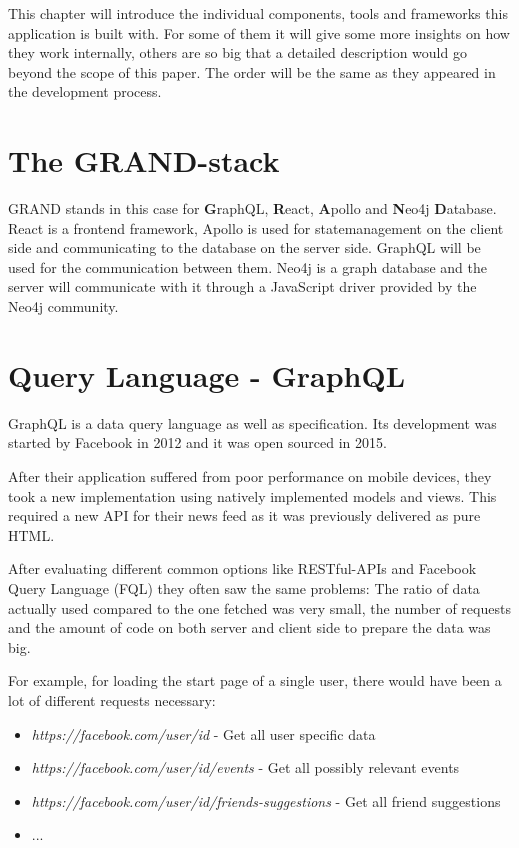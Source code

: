 This chapter will introduce the individual components, tools and frameworks this application is built with. For some of them it will give some more insights on how they work internally, others are so big that a detailed description would go beyond the scope of this paper. The order will be the same as they appeared in the development process.

\section{The GRAND-stack}
GRAND stands in this case for \textbf{G}raphQL, \textbf{R}eact, \textbf{A}pollo and \textbf{N}eo4j \textbf{D}atabase. \cite{GrandStackGettingStarted} React is a frontend framework, Apollo is used for statemanagement on the client side and communicating to the database on the server side. GraphQL will be used for the communication between them. Neo4j is a graph database and the server will communicate with it through a JavaScript driver provided by the Neo4j community.

\section{Query Language - GraphQL}
GraphQL is a data query language as well as specification. Its development was started by Facebook in 2012 and it was open sourced in 2015. \cite{GraphQLFoundation}

After their application suffered from poor performance on mobile devices, they took a new implementation using natively implemented models and views. This required a new API for their news feed as it was previously delivered as pure HTML. \cite{EngineeringFB}

After evaluating different common options like RESTful-APIs and Facebook Query Language (FQL) they often saw the same problems:  The ratio of data actually used compared to the one fetched was very small, the number of requests \cite{GraphQLIntro} and the amount of code on both server and client side to prepare the data was big. \cite{EngineeringFB}

For example, for loading the start page of a single user, there would have been a lot of different requests necessary:
\begin{itemize}
\item \emph{https://facebook.com/user/id} - Get all user specific data
\item \emph{https://facebook.com/user/id/events} - Get all possibly relevant events
\item \emph{https://facebook.com/user/id/friends-suggestions} - Get all friend suggestions
\item ...
\end{itemize} \cite{GraphQLIntro}


